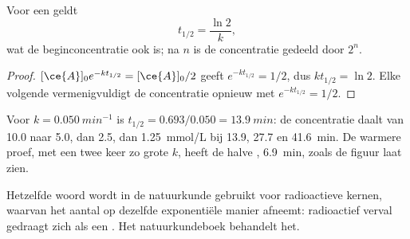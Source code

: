 \begin{proposition}\label{prop:g12:reaction-rates:half-life}
Voor een  geldt
\[
  t_{1/2} = \frac{\ln 2}{k},
\]
wat de beginconcentratie ook is; na $n$  is de
concentratie gedeeld door $2^n$.
\end{proposition}

\begin{proof}
$[\ce{A}]_0 e^{-k t_{1/2}} = [\ce{A}]_0 / 2$ geeft $e^{-k t_{1/2}} = 1/2$,
dus $k t_{1/2} = \ln 2$. Elke volgende  vermenigvuldigt de
concentratie opnieuw met $e^{-k t_{1/2}} = 1/2$.
\end{proof}


\begin{example}\label{ex:g12:reaction-rates:half-lives}
Voor $k = \qty{0.050}{min^{-1}}$ is $t_{1/2} = 0.693 / 0.050 =
\qty{13.9}{min}$: de concentratie daalt van 10.0 naar 5.0, dan 2.5,
dan \qty{1.25}{mmol/L} bij 13.9, 27.7 en \qty{41.6}{min}. De warmere
proef, met een twee keer zo grote $k$, heeft de halve ,
\qty{6.9}{min}, zoals de figuur laat zien.
\end{example}

\begin{remark}\label{rem:g12:reaction-rates:radioactive}
Hetzelfde woord wordt in de natuurkunde gebruikt voor radioactieve kernen,
waarvan het aantal op dezelfde exponentiële manier afneemt: radioactief
verval gedraagt zich als een . Het natuurkundeboek
behandelt het.
\end{remark}

